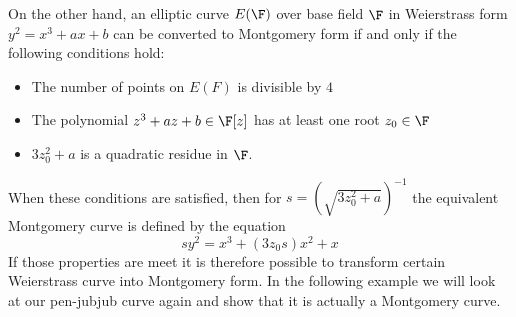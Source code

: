 On the other hand, an elliptic curve $E(\F)$ over base field $\F$ in Weierstrass form $y^2 = x^3 + a x + b$ can be converted to Montgomery form if and only if the following conditions hold:
\begin{itemize}
\item The number of points on $E(F)$ is divisible by $4$
\item The polynomial $z^3 + a z + b \in \F[z]$ has at least one root $z_0\in\F$
\item $3z_0^2 + a$ is a quadratic residue in $\F$.
\end{itemize}
When these conditions are satisfied, then for $s=({\sqrt{3z_0^{2}+a}})^{-1}$ the equivalent Montgomery curve is defined by the equation
$$
sy^{2}=x^{3}+(3z_0 s)x^{2}+x
$$
If those properties are meet it is therefore possible to transform certain Weierstrass curve into Montgomery form. In the following example we will look at our pen-jubjub curve again and show that it is actually a Montgomery curve.
